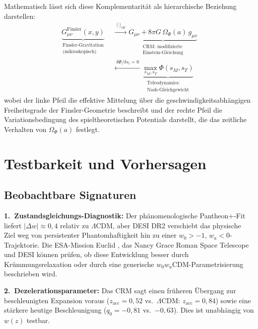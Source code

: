 \documentclass[aps,prd,twocolumn,superscriptaddress,nofootinbib]{revtex4-2}
\begin{document}
Mathematisch lässt sich diese Komplementarität als hierarchische Beziehung darstellen:
\begin{equation}
\begin{split}
\underbrace{G_{\mu\nu}^{\mathrm{Finsler}}(x, y)}_{\substack{\text{Finsler-Gravitation}\\\text{(mikroskopisch)}}}
&\;\xrightarrow{\;\langle\cdot\rangle_{\mathrm{eff}}\;}
\underbrace{G_{\mu\nu} + 8\pi G\,\Omega_\Phi(a)\,g_{\mu\nu}}_{\substack{\text{CRM: modifizierte}\\\text{Einstein-Gleichung}}} \\
&\;\xleftarrow{\;\delta\Phi/\delta s_i = 0\;}
\underbrace{\max_{s_M, s_T} \Phi(s_M, s_T)}_{\substack{\text{Teleodynamics:}\\\text{Nash-Gleichgewicht}}}
\end{split}
\label{eq:complementarity}
\end{equation}
wobei der linke Pfeil die effektive Mittelung über die geschwindigkeitsabhängigen Freiheitsgrade der Finsler-Geometrie beschreibt und der rechte Pfeil die Variationsbedingung des spieltheoretischen Potentials darstellt, die das zeitliche Verhalten von $\Omega_\Phi(a)$ festlegt.

\section{Testbarkeit und Vorhersagen}
\label{sec:testability}

\subsection{Beobachtbare Signaturen}

\textbf{1.~Zustandsgleichungs-Diagnostik:} Der phänomenologische Pantheon+-Fit liefert $|\Delta w| \approx 0{,}4$ relativ zu $\Lambda$CDM, aber DESI DR2 verschiebt das physische Ziel weg von persistenter Phantomhaftigkeit hin zu einer $w_0>-1$, $w_a<0$-Trajektorie. Die ESA-Mission Euclid \cite{Euclid2024}, das Nancy Grace Roman Space Telescope und DESI können prüfen, ob diese Entwicklung besser durch Krümmungsrelaxation oder durch eine generische $w_0w_a$CDM-Parametrisierung beschrieben wird.

\textbf{2.~Dezelerationsparameter:} Das CRM sagt einen früheren Übergang zur beschleunigten Expansion voraus ($z_{\mathrm{acc}} = 0{,}52$ vs.\ $\Lambda$CDM: $z_{\mathrm{acc}} = 0{,}84$) sowie eine stärkere heutige Beschleunigung ($q_0 = -0{,}81$ vs.\ $-0{,}63$). Dies ist unabhängig von $w(z)$ testbar.
\end{document}
